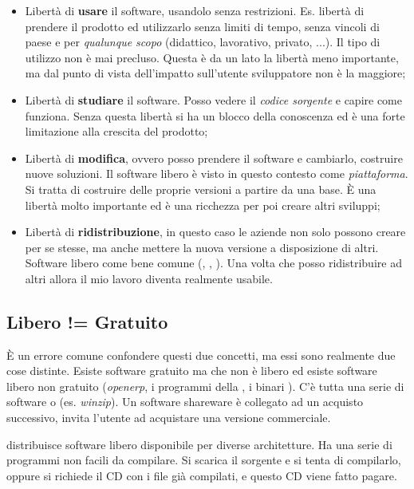 \begin{itemize}

\item Libertà di \textbf{usare} il software, usandolo senza restrizioni. Es. libertà di prendere il prodotto ed utilizzarlo senza limiti di tempo, senza vincoli di paese e per \textit{qualunque scopo} (didattico, lavorativo, privato, ...). Il tipo di utilizzo non è mai precluso. Questa è da un lato la libertà meno importante, ma dal punto di vista dell'impatto sull'utente sviluppatore non è la maggiore;
\item Libertà di \textbf{studiare} il software. Posso vedere il \textit{codice sorgente} e capire come funziona. Senza questa libertà si ha un blocco della conoscenza ed è una forte limitazione alla crescita del prodotto;
\item Libertà di \textbf{modifica}, ovvero posso prendere il software e cambiarlo, costruire nuove soluzioni. Il software libero è visto in questo contesto come \textit{piattaforma}. Si tratta di costruire delle proprie versioni a partire da una base. È una libertà molto importante ed è una ricchezza per poi creare altri sviluppi;
\item Libertà di \textbf{ridistribuzione}, in questo caso le aziende non solo possono creare per se stesse, ma anche mettere la nuova versione a disposizione di altri. Software libero come bene comune (, , ). Una volta che posso ridistribuire ad altri allora il mio lavoro diventa realmente usabile. 

\end{itemize}

\subsection{Libero != Gratuito}

È un errore comune confondere questi due concetti, ma essi sono realmente due cose distinte. Esiste software gratuito ma che non è libero ed esiste software libero non gratuito (\textit{openerp}, i programmi della , i binari ). C'è tutta una serie di software  o  (es. \textit{winzip}). Un software shareware è collegato ad un acquisto successivo, invita l'utente ad acquistare una versione commerciale.

 distribuisce software libero disponibile per diverse architetture. Ha una serie di programmi non facili da compilare. Si scarica il sorgente e si tenta di compilarlo, oppure si richiede il CD con i file già compilati, e questo CD viene fatto pagare.

